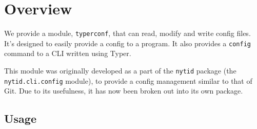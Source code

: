 \section{Overview}\label{Overview}

We provide a module, \texttt{typerconf}, that can read, modify and write config 
files.
It's designed to easily provide a config to a program.
It also provides a \texttt{config} command to a CLI written using Typer.

This module was originally developed as a part of the \texttt{nytid} package 
(the \texttt{nytid.cli.config} module), to provide a config management similar 
to that of Git.
Due to its usefulness, it has now been broken out into its own package.

\subsection{Usage}



